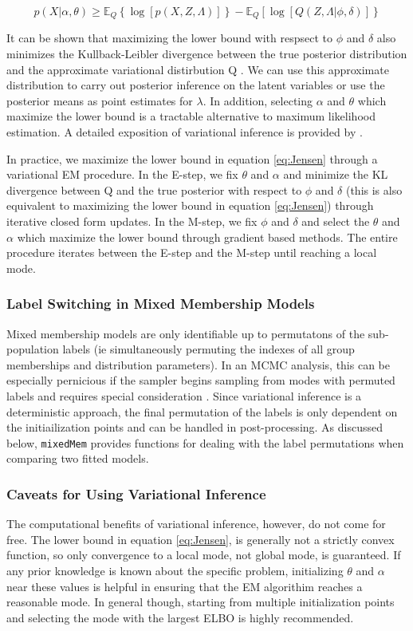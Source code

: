 \documentclass{article}\usepackage[]{graphicx}\usepackage[]{color}
\newcommand{\E}{\mathbb{E}}
\begin{document}
\begin{equation}\label{eq:Jensen}
p(X|\alpha, \theta) \geq \E_Q\left\{\log\left[p(X,Z, \Lambda)\right]\right\} - \E_Q\left[\log\left[Q(Z, \Lambda|\phi, \delta)\right]\right\}
\end{equation}

It can be shown that maximizing the lower bound with respsect to $\phi$ and $\delta$ also minimizes the Kullback-Leibler divergence between the true posterior distribution and the approximate variational distirbution Q \citep{beal2003variational}. We can use this approximate distribution to carry out posterior inference on the latent variables or use the posterior means as point estimates for $\lambda$. In addition, selecting $\alpha$ and $\theta$ which maximize the lower bound is a tractable alternative to maximum likelihood estimation. A detailed exposition of variational inference is provided by \cite{jaakkola200110}.

In practice, we maximize the lower bound in equation \ref{eq:Jensen} through a variational EM procedure. In the E-step, we fix $\theta$ and $\alpha$ and minimize the KL divergence between Q and the true posterior with respect to $\phi$ and $\delta$  (this is also equivalent to maximizing the lower bound in equation \ref{eq:Jensen}) through iterative closed form updates. In the M-step, we fix $\phi$ and $\delta$ and select the $\theta$ and $\alpha$ which maximize the lower bound through gradient based methods. The entire procedure iterates between the E-step and the M-step until reaching a local mode.   

\subsubsection{Label Switching in Mixed Membership Models}
Mixed membership models are only identifiable up to permutatons of the sub-population labels (ie simultaneously permuting the indexes of all group memberships and distribution parameters). In an MCMC analysis, this can be especially pernicious if the sampler begins sampling from modes with permuted labels and requires special consideration \citep{stephens2000dealing}. Since variational inference is a deterministic approach, the final permutation of the labels is only dependent on the initiailization points and can be handled in post-processing. As discussed below, \texttt{mixedMem} provides functions for dealing with the label permutations when comparing two fitted models.   

\subsubsection{Caveats for Using Variational Inference}
The computational benefits of variational inference, however, do not come for free. The lower bound in equation \ref{eq:Jensen}, is generally not a strictly convex function, so only convergence to a local mode, not global mode, is guaranteed. If any prior knowledge is known about the specific problem, initializing $\theta$ and $\alpha$ near these values is helpful in ensuring that the EM algorithim reaches a reasonable mode. In general though, starting from multiple initialization points and selecting the mode with the largest ELBO is highly recommended.
\end{document}
